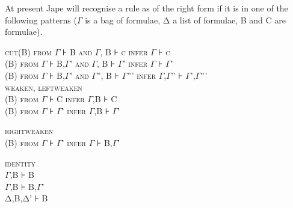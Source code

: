 At present Jape will recognise a rule as of the right form if it is in one of the following patterns (\ensuremath{\Gamma} is a bag of formulae, Δ a list of formulae, B and C are formulae).


\textsc{cut\tab (B) from} \textsc{{\large \ensuremath{\Gamma}}} \textsc{⊦} \textsc{B and} \textsc{{\large \ensuremath{\Gamma}}}\textsc{, B} \textsc{⊦} \textsc{{\large c}} \textsc{infer} \textsc{{\large \ensuremath{\Gamma}}} \textsc{⊦} \textsc{{\large c}}\\
\textsc{(B) from} \textsc{{\large \ensuremath{\Gamma}}} \textsc{⊦} \textsc{B,}\textsc{{\large \ensuremath{\Gamma}}}\textsc{'} \textsc{and} \textsc{{\large \ensuremath{\Gamma}}}\textsc{, B} \textsc{⊦} \textsc{{\large \ensuremath{\Gamma}}}\textsc{'} \textsc{infer} \textsc{{\large \ensuremath{\Gamma}}} \textsc{⊦} \textsc{{\large \ensuremath{\Gamma}}}\textsc{'}\\
\textsc{(B) from} \textsc{{\large \ensuremath{\Gamma}}} \textsc{⊦} \textsc{B,}\textsc{{\large \ensuremath{\Gamma}}}\textsc{'} \textsc{and} \textsc{{\large \ensuremath{\Gamma}}}\textsc{''}\textsc{, B} \textsc{⊦} \textsc{{\large \ensuremath{\Gamma}}}\textsc{'''} \textsc{infer} \textsc{{\large \ensuremath{\Gamma},\ensuremath{\Gamma}}}\textsc{''} \textsc{⊦} \textsc{{\large \ensuremath{\Gamma}}}\textsc{',}\textsc{\ensuremath{\Gamma}}\textsc{'''}\\
\textsc{weaken, leftweaken\\
(B) from} \textsc{\ensuremath{\Gamma}} \textsc{⊦} \textsc{C infer} \textsc{\ensuremath{\Gamma}}\textsc{,B} \textsc{⊦} \textsc{C \\
(B) from} \textsc{\ensuremath{\Gamma}} \textsc{⊦} \textsc{\ensuremath{\Gamma}}\textsc{'} \textsc{infer} \textsc{\ensuremath{\Gamma}}\textsc{,B} \textsc{⊦} \textsc{\ensuremath{\Gamma}}\textsc{'}

\textsc{rightweaken\\
(B) from} \textsc{\ensuremath{\Gamma}} \textsc{⊦} \textsc{\ensuremath{\Gamma}}\textsc{'} \textsc{infer} \textsc{\ensuremath{\Gamma}} \textsc{⊦} \textsc{B,}\textsc{\ensuremath{\Gamma}}\textsc{'}

\textsc{identity\tab }\\
\textsc{\ensuremath{\Gamma}}\textsc{,B} \textsc{⊦} \textsc{B}\\
\textsc{\ensuremath{\Gamma}}\textsc{,B} \textsc{⊦} \textsc{B,}\textsc{\ensuremath{\Gamma}}\textsc{'}\\
\textsc{Δ}\textsc{,B,}\textsc{Δ}\textsc{'} \textsc{⊦} \textsc{B}


